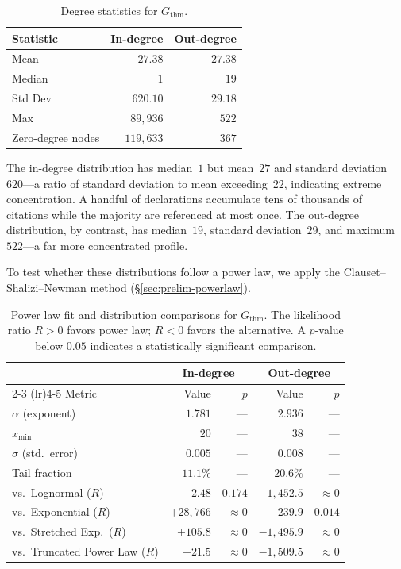 \begin{table}[ht]
\centering
\caption{Degree statistics for $G_{\mathrm{thm}}$.}
\label{tab:thm-degree}
\begin{tabular}{lrr}
\toprule
Statistic & In-degree & Out-degree \\
\midrule
Mean    & $27.38$    & $27.38$ \\
Median  & $1$        & $19$ \\
Std Dev & $620.10$   & $29.18$ \\
Max     & $89{,}936$ & $522$ \\
Zero-degree nodes & $119{,}633$ & $367$ \\
\bottomrule
\end{tabular}
\end{table}

The in-degree distribution has median~$1$ but mean~$27$ and standard deviation~$620$---a ratio of standard deviation to mean exceeding~$22$, indicating extreme concentration. A handful of declarations accumulate tens of thousands of citations while the majority are referenced at most once. The out-degree distribution, by contrast, has median~$19$, standard deviation~$29$, and maximum~$522$---a far more concentrated profile.

To test whether these distributions follow a power law, we apply the Clauset--Shalizi--Newman method (\S\ref{sec:prelim-powerlaw}).

\begin{table}[ht]
\centering
\caption{Power law fit and distribution comparisons for $G_{\mathrm{thm}}$. The likelihood ratio $R > 0$ favors power law; $R < 0$ favors the alternative. A $p$-value below $0.05$ indicates a statistically significant comparison.}
\label{tab:thm-powerlaw}
\begin{tabular}{lrrrr}
\toprule
& \multicolumn{2}{c}{In-degree} & \multicolumn{2}{c}{Out-degree} \\
\cmidrule(lr){2-3} \cmidrule(lr){4-5}
Metric & Value & $p$ & Value & $p$ \\
\midrule
$\alpha$ (exponent)     & $1.781$ & --- & $2.936$ & --- \\
$x_{\min}$              & $20$    & --- & $38$    & --- \\
$\sigma$ (std.\ error)  & $0.005$ & --- & $0.008$ & --- \\
Tail fraction           & $11.1\%$ & --- & $20.6\%$ & --- \\
\midrule
vs.\ Lognormal ($R$)          & $-2.48$   & $0.174$   & $-1{,}452.5$ & $\approx 0$ \\
vs.\ Exponential ($R$)        & $+28{,}766$ & $\approx 0$ & $-239.9$ & $0.014$ \\
vs.\ Stretched Exp.\ ($R$)    & $+105.8$  & $\approx 0$ & $-1{,}495.9$ & $\approx 0$ \\
vs.\ Truncated Power Law ($R$) & $-21.5$  & $\approx 0$ & $-1{,}509.5$ & $\approx 0$ \\
\bottomrule
\end{tabular}
\end{table}

